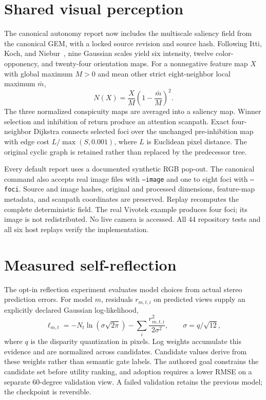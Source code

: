 \section{Shared visual perception}
The canonical autonomy report now includes the multiscale saliency field from the canonical GEM, with a locked source revision and source hash. Following Itti, Koch, and Niebur~\cite{itti1998}, nine Gaussian scales yield six intensity, twelve color-opponency, and twenty-four orientation maps. For a nonnegative feature map $X$ with global maximum $M>0$ and mean other strict eight-neighbor local maximum $\bar m$,
\begin{equation}
N(X)=\frac{X}{M}\left(1-\frac{\bar m}{M}\right)^2.
\end{equation}
The three normalized conspicuity maps are averaged into a saliency map. Winner selection and inhibition of return produce an attention scanpath. Exact four-neighbor Dijkstra connects selected foci over the unchanged pre-inhibition map with edge cost $L/\max(S,0.001)$, where $L$ is Euclidean pixel distance. The original cyclic graph is retained rather than replaced by the predecessor tree.

Every default report uses a documented synthetic RGB pop-out. The canonical command also accepts real image files with \texttt{--image} and one to eight foci with \texttt{--foci}. Source and image hashes, original and processed dimensions, feature-map metadata, and scanpath coordinates are preserved. Replay recomputes the complete deterministic field. The real Vivotek example produces four foci; its image is not redistributed. No live camera is accessed. All 44 repository tests and all six host replays verify the implementation.

\section{Measured self-reflection}
The opt-in reflection experiment evaluates model choices from actual stereo prediction errors. For model $m$, residuals $r_{m,t,i}$ on predicted views supply an explicitly declared Gaussian log-likelihood,
\begin{equation}
\ell_{m,t}=-N_t\ln(\sigma\sqrt{2\pi})-\sum_i\frac{r_{m,t,i}^2}{2\sigma^2},
\qquad \sigma=q/\sqrt{12},
\end{equation}
where $q$ is the disparity quantization in pixels. Log weights accumulate this evidence and are normalized across candidates. Candidate values derive from these weights rather than semantic gate labels. The authored goal constrains the candidate set before utility ranking, and adoption requires a lower RMSE on a separate 60-degree validation view. A failed validation retains the previous model; the checkpoint is reversible.

